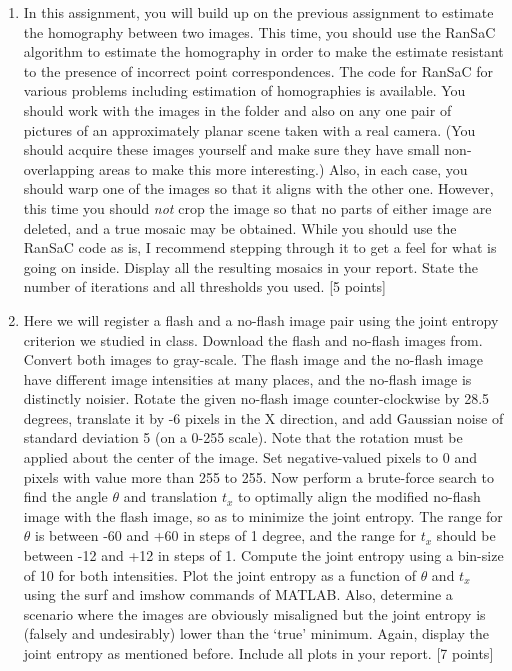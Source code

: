\documentclass[11pt]{article}
\begin{document}
\begin{enumerate}
\item In this assignment, you will build up on the previous assignment to estimate the homography between two images. This time, you should use the RanSaC algorithm to estimate the homography in order to make the estimate resistant to the presence of incorrect point correspondences. The code for RanSaC for various problems including estimation of homographies is available. You should work with the images in the folder and also on any one pair of pictures of an approximately planar scene taken with a real camera. (You should acquire these images yourself and make sure they have small non-overlapping areas to make this more interesting.) Also, in each case, you should warp one of the images so that it aligns with the other one. However, this time you should \emph{not} crop the image so that no parts of either image are deleted, and a true mosaic may be obtained. While you should use the RanSaC code as is, I recommend stepping through it to get a feel for what is going on inside. Display all the resulting mosaics in your report. State the number of iterations and all thresholds you used. \textsf{[5 points]}

\item Here we will register a flash and a no-flash image pair using the joint entropy criterion we studied in class. Download the flash and no-flash images from. Convert both images to gray-scale. The flash image and the no-flash image have different image intensities at many places, and the no-flash image is distinctly noisier. Rotate the given no-flash image counter-clockwise by 28.5 degrees, translate it by -6 pixels in the X direction, and add Gaussian noise of standard deviation 5 (on a 0-255 scale). Note that the rotation must be applied about the center of the image. Set negative-valued pixels to 0 and pixels with value more than 255 to 255. Now perform a brute-force search to find the angle $\theta$ and translation $t_x$ to optimally align the modified no-flash image with the flash image, so as to minimize the joint entropy. The range for $\theta$ is between -60 and +60 in steps of 1 degree, and the range for $t_x$ should be between -12 and +12 in steps of 1. Compute the joint entropy using a bin-size of 10 for both intensities. Plot the joint entropy as a function of $\theta$ and $t_x$ using the surf and imshow commands of MATLAB. Also, determine a scenario where the images are obviously misaligned but the joint entropy is (falsely and undesirably) lower than the `true' minimum. Again, display the joint entropy as mentioned before. Include all plots in your report. \textsf{[7 points]} 

\end{enumerate}
\end{document}
